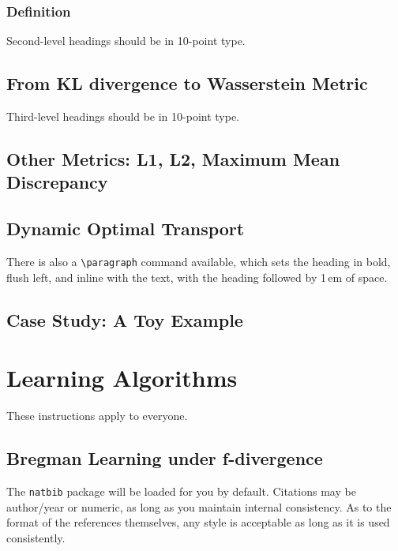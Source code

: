 \documentclass{article}
\begin{document}
\subsubsection{Definition}

Second-level headings should be in 10-point type.

\subsection{From KL divergence to Wasserstein Metric}

Third-level headings should be in 10-point type.

\subsection{Other Metrics: L1, L2, Maximum Mean Discrepancy}

\subsection{Dynamic Optimal Transport}

There is also a \verb+\paragraph+ command available, which sets the
heading in bold, flush left, and inline with the text, with the
heading followed by 1\,em of space.

\subsection{Case Study: A Toy Example}



\section{Learning Algorithms}
\label{Sec:Learning}

These instructions apply to everyone.


\subsection{Bregman Learning under f-divergence}

The \verb+natbib+ package will be loaded for you by default.
Citations may be author/year or numeric, as long as you maintain
internal consistency.  As to the format of the references themselves,
any style is acceptable as long as it is used consistently.
\end{document}
